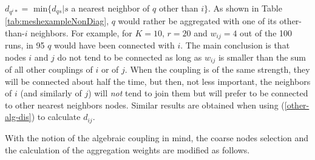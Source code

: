 \documentclass[final]{siamltex}
\begin{document}
$d_{q^i*} = $ min$\{d_{qs}|s$ a nearest neighbor of $q$ other than $i\}$.
As shown in Table \ref{tab:meshexampleNonDiag}, $q$ would rather be aggregated
with one of its other-than-$i$ neighbors. For example, for $K=10$, $r=20$ and $w_{ij}=4$ out of the 100 runs, in 95 $q$ would have been connected with $i$.
The main conclusion is that nodes $i$ and $j$ do not tend to be connected as long as $w_{ij}$ is smaller than the sum of all other couplings of $i$ or of $j$. When the coupling is of the same strength, they will be connected about half the time, but then, not less important, the neighbors of $i$ (and similarly of $j$) will {\it not} tend to join them but will prefer to be connected to other nearest neighbors nodes.
Similar results are obtained when using (\ref{other-alg-dis}) to calculate $d_{ij}$.
\par With the notion of the algebraic coupling in mind, the
coarse nodes selection and the calculation of the aggregation
weights are modified as follows.
\end{document}

